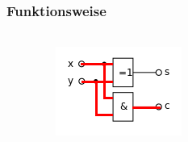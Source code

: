 \begin{frame}
    \frametitle{Funktionsweise}
    \framesubtitle{}
    \begin{columns}[c]
            \begin{center}
            \end{center}
            \begin{figure}[H]
            \begin{center}
                    \includegraphics[scale=0.6]{./img/schaltung/halbadd_fun_11.png}
            \end{center}
            \end{figure}
    \end{columns}
\end{frame}
